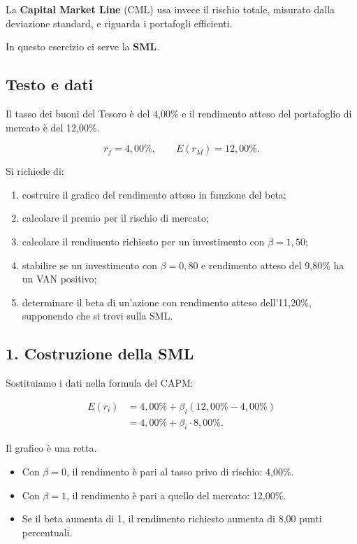 \noindent La \textbf{Capital Market Line} (CML)
usa invece il rischio totale,
misurato dalla deviazione standard,
e riguarda i portafogli efficienti.

\noindent In questo esercizio
ci serve la \textbf{SML}.


\subsection*{Testo e dati}

\noindent Il tasso dei buoni del Tesoro è del 4,00\%
e il rendimento atteso del portafoglio
di mercato è del 12,00\%.

\[
r_f=4{,}00\%,
\qquad
E(r_M)=12{,}00\%.
\]

\noindent Si richiede di:

\begin{enumerate}
    \item costruire il grafico
    del rendimento atteso in funzione del beta;

    \item calcolare il premio
    per il rischio di mercato;

    \item calcolare il rendimento richiesto
    per un investimento con $\beta=1{,}50$;

    \item stabilire se un investimento
    con $\beta=0{,}80$ e rendimento atteso
    del 9,80\% ha un VAN positivo;

    \item determinare il beta di un'azione
    con rendimento atteso dell'11,20\%,
    supponendo che si trovi sulla SML.
\end{enumerate}


\subsection*{1. Costruzione della SML}

\noindent Sostituiamo i dati nella formula del CAPM:

\[
\begin{aligned}
E(r_i)
&=4{,}00\%+\beta_i(12{,}00\%-4{,}00\%)\\
&=\boxed{4{,}00\%+\beta_i\cdot8{,}00\%}.
\end{aligned}
\]

\noindent Il grafico è una retta.

\begin{itemize}
    \item Con $\beta=0$, il rendimento
    è pari al tasso privo di rischio:
    4,00\%.

    \item Con $\beta=1$, il rendimento
    è pari a quello del mercato:
    12,00\%.

    \item Se il beta aumenta di 1,
    il rendimento richiesto aumenta
    di 8,00 punti percentuali.
\end{itemize}


